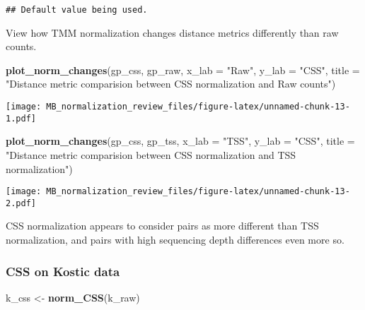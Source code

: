 \documentclass[
]{book}
\newenvironment{Shaded}{\begin{snugshade}}{\end{snugshade}}
\newcommand{\DataTypeTok}[1]{\textcolor[rgb]{0.13,0.29,0.53}{#1}}
\newcommand{\KeywordTok}[1]{\textcolor[rgb]{0.13,0.29,0.53}{\textbf{#1}}}
\newcommand{\NormalTok}[1]{#1}
\newcommand{\StringTok}[1]{\textcolor[rgb]{0.31,0.60,0.02}{#1}}
\begin{document}
\begin{verbatim}
## Default value being used.
\end{verbatim}

View how TMM normalization changes distance metrics differently than raw counts.

\begin{Shaded}
\begin{Highlighting}[]
\KeywordTok{plot\_norm\_changes}\NormalTok{(gp\_css, gp\_raw, }
                  \DataTypeTok{x\_lab =} \StringTok{"Raw"}\NormalTok{, }\DataTypeTok{y\_lab =} \StringTok{"CSS"}\NormalTok{,}
                  \DataTypeTok{title =} \StringTok{"Distance metric comparision between CSS normalization and Raw counts"}\NormalTok{)}
\end{Highlighting}
\end{Shaded}

\texttt{[image: MB\_normalization\_review\_files/figure-latex/unnamed-chunk-13-1.pdf]}

\begin{Shaded}
\begin{Highlighting}[]
\KeywordTok{plot\_norm\_changes}\NormalTok{(gp\_css, gp\_tss, }
                  \DataTypeTok{x\_lab =} \StringTok{"TSS"}\NormalTok{, }\DataTypeTok{y\_lab =} \StringTok{"CSS"}\NormalTok{,}
                  \DataTypeTok{title =} \StringTok{"Distance metric comparision between CSS normalization and TSS normalization"}\NormalTok{)}
\end{Highlighting}
\end{Shaded}

\texttt{[image: MB\_normalization\_review\_files/figure-latex/unnamed-chunk-13-2.pdf]}

CSS normalization appears to consider pairs as more different than TSS normalization, and pairs with high sequencing depth differences even more so.

\hypertarget{css-on-kostic-data}{%
\subsubsection{CSS on Kostic data}\label{css-on-kostic-data}}

\begin{Shaded}
\begin{Highlighting}[]
\NormalTok{k\_css \textless{}{-}}\StringTok{ }\KeywordTok{norm\_CSS}\NormalTok{(k\_raw)}
\end{Highlighting}
\end{Shaded}
\end{document}
